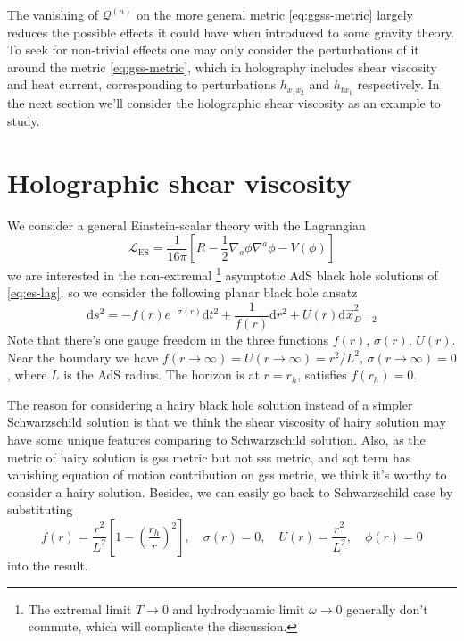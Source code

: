 \documentclass[a4paper,11pt]{article}
\newcommand{\dd}{{\mathrm d}}
\begin{document}
The vanishing of $\mathcal Q^{(n)}$ on the more general metric \eqref{eq:ggss-metric} largely reduces the possible effects it could have when introduced to some gravity theory. To seek for non-trivial effects one may only consider the perturbations of it around the metric \eqref{eq:gss-metric}, which in holography includes shear viscosity and heat current, corresponding to perturbations $h_{x_1 x_2}$ and $h_{tx_1}$ respectively. In the next section we'll consider the holographic shear viscosity as an example to study.

\section{Holographic shear viscosity}
\label{sec:sv}
We consider a general Einstein-scalar theory with the Lagrangian
\begin{equation}\label{eq:es-lag}
    \mathcal L_{\mathrm{ES}} = \frac{1}{16\pi}\left[R - \frac12 \nabla_a\phi\nabla^a\phi - V(\phi)\right]
\end{equation}
we are interested in the non-extremal \footnote{The extremal limit $T \to 0$ and hydrodynamic limit $\omega \to 0$ generally don't commute, which will complicate the discussion.} asymptotic AdS black hole solutions of \eqref{eq:es-lag}, so we consider the following planar black hole ansatz
\begin{equation}\label{eq:planar-bh-metric}
    \dd s^2 = -f(r)e^{-\sigma(r)}\dd t^2 + \frac{1}{f(r)}\dd r^2 + U(r)\dd\vec x_{D - 2}^2
\end{equation}
Note that there's one gauge freedom in the three functions $f(r)$, $\sigma(r)$, $U(r)$. Near the boundary we have $f(r \to \infty) = U(r \to \infty) = r^2 / L^2$, $\sigma(r \to \infty) = 0$, where $L$ is the AdS radius. The horizon is at $r = r_h$, satisfies $f(r_h) = 0$.

The reason for considering a hairy black hole solution instead of a simpler Schwarzschild solution is that we think the shear viscosity of hairy solution may have some unique features comparing to Schwarzschild solution. Also, as the metric of hairy solution is \ac{gss} metric but not \ac{sss} metric, and \ac{sqt} term has vanishing equation of motion contribution on \ac{gss} metric, we think it's worthy to consider a hairy solution. Besides, we can easily go back to Schwarzschild case by substituting
\begin{equation}
    f(r) = \frac{r^2}{L^2}\left[1 - \left(\frac{r_h}{r}\right)^2\right],
    \quad \sigma(r) = 0,
    \quad U(r) = \frac{r^2}{L^2},
    \quad \phi(r) = 0
\end{equation}
into the result.
\end{document}
